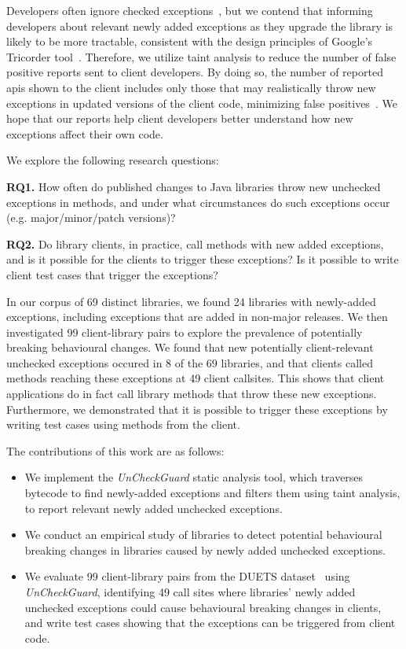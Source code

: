 Developers often ignore checked exceptions~\cite{nakshatri16:_analy_java}, but we
contend that informing developers about relevant newly added exceptions as they upgrade
the library is likely to be more tractable, consistent with the design principles
of Google’s Tricorder tool~\cite{sadowski15:_tricor}. Therefore, we utilize taint
analysis to reduce the number of false positive reports sent to client developers.
By doing so, the number of reported \gls{api}s shown to the client includes only
those that may realistically throw new exceptions in updated versions of the client
code, minimizing false positives~\cite{pashchenko20:_vuln4}.
We hope that our reports help client developers better understand how new exceptions
affect their own code.

We explore the following research questions:

\noindent
{\bf RQ1.} How often do published changes to Java libraries throw new unchecked exceptions in methods,
and under what circumstances do such exceptions occur (e.g. major/minor/patch versions)?

\noindent
{\bf RQ2.} Do library clients, in practice, call methods with new added exceptions, and is it possible for the clients to trigger these exceptions? Is it possible to write client test cases that trigger the exceptions?

In our corpus of 69 distinct libraries, we found 24 libraries with newly-added exceptions, including exceptions that are added in non-major releases.
We then investigated 99 client-library pairs to explore the prevalence of potentially breaking behavioural changes.
We found that new potentially client-relevant unchecked exceptions occured in 8 of the 69 libraries, and that clients called methods reaching these exceptions at 49 client callsites.
This shows that client applications do in fact call library methods that throw these new exceptions.
Furthermore, we demonstrated that it is possible to trigger these exceptions by writing test cases using methods from the client.

The contributions of this work are as follows:

\begin{itemize}
    \item We implement the \textit{UnCheckGuard} static analysis tool, which traverses bytecode to find newly-added exceptions and filters them using taint analysis, to report relevant newly added unchecked exceptions.
    \item We conduct an empirical study of libraries to detect potential behavioural breaking changes in libraries caused by newly added unchecked exceptions.
    \item We evaluate 99 client-library pairs from the DUETS dataset~\cite{durieux21:_duets} using \textit{UnCheckGuard}, identifying 49 call sites where libraries' newly added unchecked exceptions could cause behavioural breaking changes in clients, and write test cases showing that the exceptions can be triggered from client code.
\end{itemize}